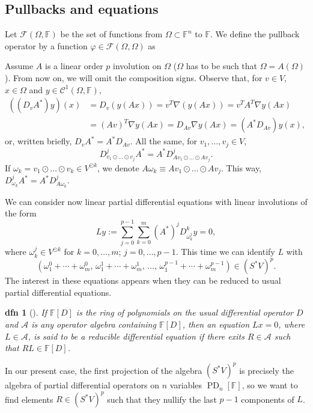 \documentclass[a4paper,12pt,onecolumn]{article}
\theoremstyle{ptheorem}
\theoremstyle{hdef}
\newtheorem{dfn}[thm]{dfn}
\theoremstyle{premark}
\numberwithin{equation}{section}
\numberwithin{figure}{section}
\DeclareMathOperator{\PD}{PD}
\newcommand{\cA}{{\mathcal A}}
\newcommand{\cC}{{\mathcal C}}
\newcommand{\cF}{{\mathcal F}}
\newcommand{\bF}{{\mathbb F}}
\newcommand{\<}{\langle}
\renewcommand{\>}{\rangle}
\renewcommand{\<}{\left<}
\renewcommand{\>}{\right>}
\renewcommand{\(}{\left(}
\renewcommand{\)}{\right)}
\begin{document}
\subsection{Pullbacks and equations}
Let $\cF(\Omega,\bF)$ be the set of functions from $\Omega\subset\bF^n$ to $\bF$. We define the pullback operator by a function $\varphi\in\cF(\Omega,\Omega)$ as
\begin{center}
\end{center}
Assume $A$ is a linear  order $p$ involution on $\Omega$ ($\Omega$ has to be such that $\Omega=A(\Omega)$). From now on, we will omit the composition signs. Observe that, for $v\in V$, $x\in\Omega$ and $y\in\cC^1(\Omega,\bF)$,
\begin{align*}((D_vA^*)y)(x) & =D_v(y(Ax))=v^T\nabla( y(Ax))=v^TA^T\nabla y(Ax) \\ & =(Av)^T\nabla y(Ax)=D_{Av}\nabla y(Ax)=(A^*D_{Av})y(x),\end{align*}
or, written briefly, $D_vA^*=A^*D_{Av}$. All the same, for $v_1,\dots,v_j\in V$,
\[D^j_{v_1\odot\dots\odot v_j}A^*=A^*D^j_{Av_1\odot\dots\odot Av_j}.\]
If $\omega_k=v_1\odot\dots\odot v_k\in V^{\odot k}$, we denote $A\omega_k\equiv Av_1\odot\dots\odot Av_j$. This way, $D^j_{\omega_k}A^*=A^*D^j_{A\omega_k}$.\par
We can consider now linear partial differential equations with linear involutions of the form
\[Ly:=\sum_{j=0}^{p-1}\sum_{k=0}^m(A^*)^jD^k_{\omega^j_k}y=0,\]
where $\omega^j_k\in V^{\odot k}$ for $k=0,\dots,m$; $j=0,\dots,p-1$. This time we can identify $L$ with
\[\left(\omega_1^0+\cdots+\omega_m^0,\,\omega_1^1+\cdots+\omega_m^1,\,\dots,\,\omega_1^{p-1}+\cdots+\omega_m^{p-1}\right)\in(S^*V)^p.\]
The interest in these equations appears when they can be reduced to usual partial differential equations.
\begin{dfn}[\cite{CTMal}]
If $\bF[D]$ is the ring of polynomials on the usual differential operator $D$ and $\cA$ is any operator algebra containing $\bF[D]$, then an equation $L x=0$, where $L\in\cA$, is said to be a \emph{reducible differential equation} if there exits $R\in\cA$ such that $RL\in\bF[D]$.
\end{dfn}

In our present case, the first projection of the algebra $(S^*V)^p$ is precisely the algebra of partial differential operators on $n$ variables $\PD_n[\bF]$, so we want to find elements $R\in (S^*V)^p$ such that they nullify the last $p-1$ components of $L$.
\end{document}
